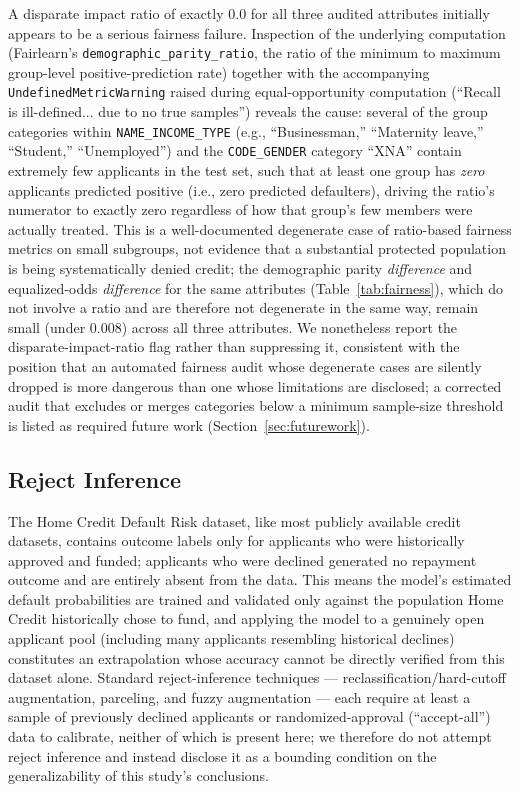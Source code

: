 \documentclass[journal]{IEEEtran}
\begin{document}
A disparate impact ratio of exactly 0.0 for all three audited attributes initially appears to be a serious fairness failure. Inspection of the underlying computation (Fairlearn's \texttt{demographic\_parity\_ratio}, the ratio of the minimum to maximum group-level positive-prediction rate) together with the accompanying \texttt{UndefinedMetricWarning} raised during equal-opportunity computation (``Recall is ill-defined... due to no true samples'') reveals the cause: several of the group categories within \texttt{NAME\_INCOME\_TYPE} (e.g., ``Businessman,'' ``Maternity leave,'' ``Student,'' ``Unemployed'') and the \texttt{CODE\_GENDER} category ``XNA'' contain extremely few applicants in the test set, such that at least one group has \emph{zero} applicants predicted positive (i.e., zero predicted defaulters), driving the ratio's numerator to exactly zero regardless of how that group's few members were actually treated. This is a well-documented degenerate case of ratio-based fairness metrics on small subgroups, not evidence that a substantial protected population is being systematically denied credit; the demographic parity \emph{difference} and equalized-odds \emph{difference} for the same attributes (Table~\ref{tab:fairness}), which do not involve a ratio and are therefore not degenerate in the same way, remain small (under 0.008) across all three attributes. We nonetheless report the disparate-impact-ratio flag rather than suppressing it, consistent with the position that an automated fairness audit whose degenerate cases are silently dropped is more dangerous than one whose limitations are disclosed; a corrected audit that excludes or merges categories below a minimum sample-size threshold is listed as required future work (Section~\ref{sec:futurework}).

\subsection{Reject Inference}

The Home Credit Default Risk dataset, like most publicly available credit datasets, contains outcome labels only for applicants who were historically approved and funded; applicants who were declined generated no repayment outcome and are entirely absent from the data. This means the model's estimated default probabilities are trained and validated only against the population Home Credit historically chose to fund, and applying the model to a genuinely open applicant pool (including many applicants resembling historical declines) constitutes an extrapolation whose accuracy cannot be directly verified from this dataset alone. Standard reject-inference techniques --- reclassification/hard-cutoff augmentation, parceling, and fuzzy augmentation --- each require at least a sample of previously declined applicants or randomized-approval (``accept-all'') data to calibrate, neither of which is present here; we therefore do not attempt reject inference and instead disclose it as a bounding condition on the generalizability of this study's conclusions.
\end{document}
